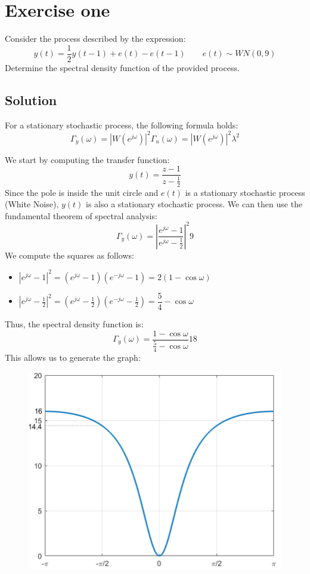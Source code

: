 \section{Exercise one}

Consider the process described by the expression:
\[y(t)=\dfrac{1}{2}y(t-1)+e(t)-e(t-1) \qquad e(t) \sim WN(0,9)\]
Determine the spectral density function of the provided process.

\subsection*{Solution}
For a stationary stochastic process, the following formula holds:
\[\Gamma_y(\omega)=\left\lvert W(e^{j\omega})\right\rvert^2 \Gamma_u(\omega) = \left\lvert W(e^{j\omega})\right\rvert^2 \lambda^2\]

We start by computing the transfer function:
\[y(t)=\dfrac{z-1}{z-\frac{1}{2}}\]
Since the pole is inside the unit circle and $e(t)$ is a stationary stochastic process (White Noise), $y(t)$ is also a stationary stochastic process.
We can then use the fundamental theorem of spectral analysis:
\[\Gamma_y(\omega) = \left\lvert \dfrac{e^{j\omega}-1}{e^{j\omega}-\frac{1}{2}}\right\rvert^2 9\]
We compute the squares as follows:
\begin{itemize}
    \item $\left\lvert e^{j\omega}-1 \right\rvert^2=\left( e^{j\omega}-1 \right)\left( e^{-j\omega}-1 \right)=2(1-\cos\omega)$
    \item $\left\lvert e^{j\omega}-\frac{1}{2}\right\rvert^2=\left( e^{j\omega}-\frac{1}{2} \right)\left( e^{-j\omega}-\frac{1}{2} \right)=\dfrac{5}{4}-\cos\omega$
\end{itemize}
Thus, the spectral density function is:
\[\Gamma_y(\omega) = \dfrac{1-\cos\omega}{\frac{5}{4}-\cos\omega} 18\]
This allows us to generate the graph:
\begin{figure}[H]
    \centering
    \includegraphics[width=0.4\linewidth]{images/spec.png}
\end{figure}